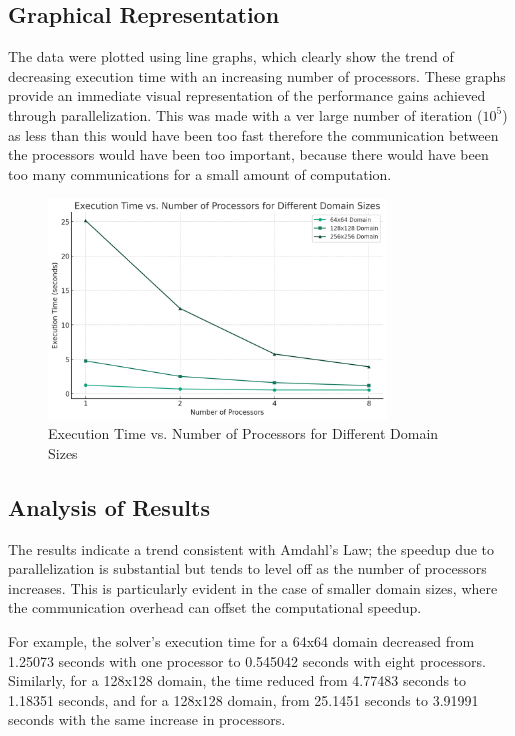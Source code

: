 \documentclass[11pt]{article}
\begin{document}
        \subsection{Graphical Representation}
        The data were plotted using line graphs, which clearly show the trend of decreasing execution time with an increasing number of processors. These graphs provide an immediate visual representation of the performance gains achieved through parallelization. This was made with a ver large number of iteration ($10^5$) as less than this would have been too fast therefore the communication between the processors would have been too important, because there would have been too many communications for a small amount of computation.

    \begin{figure}[ht]
        \centering
        \includegraphics[width=0.8\textwidth]{img/performance.png}
        \caption{Execution Time vs. Number of Processors for Different Domain Sizes}\label{fig:execution_time}
    \end{figure}

        \subsection{Analysis of Results}
        The results indicate a trend consistent with Amdahl's Law; the speedup due to parallelization is substantial but tends to level off as the number of processors increases. This is particularly evident in the case of smaller domain sizes, where the communication overhead can offset the computational speedup.

        For example, the solver's execution time for a 64x64 domain decreased from 1.25073 seconds with one processor to 0.545042 seconds with eight processors. Similarly, for a 128x128 domain, the time reduced from 4.77483 seconds to 1.18351 seconds, and for a 128x128 domain, from 25.1451 seconds to 3.91991 seconds with the same increase in processors.
\end{document}
